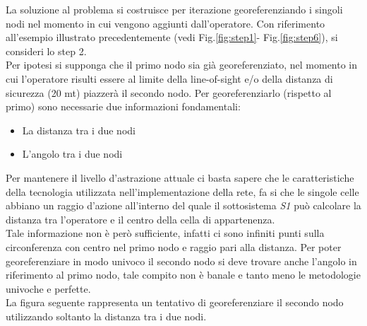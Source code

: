 La soluzione al problema si costruisce per iterazione georeferenziando i singoli nodi nel momento in cui vengono aggiunti dall'operatore. Con riferimento all'esempio illustrato precedentemente (vedi Fig.\ref{fig:step1}- Fig.\ref{fig:step6}), si consideri lo step 2.\\
Per ipotesi si supponga che il primo nodo sia già georeferenziato, nel momento in cui l'operatore risulti essere al limite della line-of-sight e/o della distanza di sicurezza (20 mt) piazzerà il secondo nodo. Per georeferenziarlo (rispetto al primo) sono necessarie due informazioni fondamentali:
\begin{itemize}
	\item La distanza tra i due nodi
	\item L'angolo tra i due nodi
\end{itemize} 
Per mantenere il livello d'astrazione attuale ci basta sapere che le caratteristiche della tecnologia utilizzata nell'implementazione della rete, fa si che le singole celle abbiano un raggio d'azione all'interno del quale il sottosistema \textit{S1} può calcolare la distanza tra l'operatore e il centro della cella di appartenenza.\\
Tale informazione non è però sufficiente, infatti ci sono infiniti punti sulla circonferenza con centro nel primo nodo e raggio pari alla distanza. Per poter georeferenziare in modo univoco il secondo nodo si deve trovare anche l'angolo in riferimento al primo nodo, tale compito non è banale e tanto meno le metodologie univoche e perfette.\\
La figura seguente rappresenta un tentativo di georeferenziare il secondo nodo utilizzando soltanto la distanza tra i due nodi.
